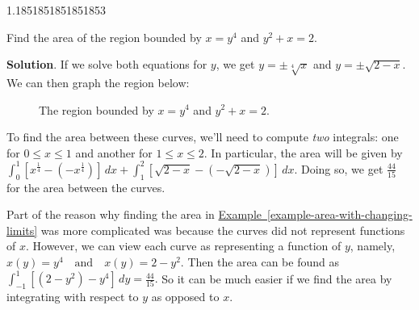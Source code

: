 \documentclass[10pt,]{book}
\theoremstyle{ptxplainnotitle}
\theoremstyle{ptxplaintitle}
\theoremstyle{ptxplainnotitle}
\theoremstyle{ptxplaintitle}
\theoremstyle{ptxplainnotitle}
\theoremstyle{ptxplaintitle}
\theoremstyle{ptxdefinitionnotitle}
\theoremstyle{ptxdefinitiontitle}
\theoremstyle{ptxdefinitionnotitle}
\theoremstyle{ptxdefinitiontitle}
\theoremstyle{ptxdefinitionnotitle}
\theoremstyle{ptxdefinitiontitle}
\theoremstyle{ptxdefinitionnotitle}
\theoremstyle{ptxdefinitiontitle}
\theoremstyle{ptxdefinitionnotitle}
\theoremstyle{ptxdefinitiontitle}
\numberwithin{equation}{section}
\begin{document}
\begin{sageoutput}
1.1851851851851853
\end{sageoutput}
\begin{example}\label{example-area-with-changing-limits}
\hypertarget{p-620}{}%
Find the area of the region bounded by \(x = y^{4}\) and \(y^{2} + x = 2\).%
\par\smallskip%
\noindent\textbf{Solution}.\hypertarget{solution-135}{}\quad%
\hypertarget{p-621}{}%
If we solve both equations for \(y\), we get \(y = \pm\sqrt[4]{x}\) and \(y = \pm\sqrt{2 - x}\). We can then graph the region below: \begin{figure}
\centering
{
}
\caption{The region bounded by \(x = y^{4}\) and \(y^{2} + x = 2\).\label{figure-graph-between-x-curves}}
\end{figure}
%
\par
\hypertarget{p-622}{}%
To find the area between these curves, we'll need to compute \emph{two} integrals: one for \(0\leq x\leq 1\) and another for \(1\leq x\leq 2\). In particular, the area will be given by \(\int_{0}^{1}[x^{\frac{1}{4}} - (-x^{\frac{1}{4}})]\,dx + \int_{1}^{2}[\sqrt{2 - x} - (-\sqrt{2 - x})]\,dx\). Doing so, we get \(\frac{44}{15}\) for the area between the curves.%
\end{example}
\hypertarget{p-623}{}%
Part of the reason why finding the area in \hyperref[example-area-with-changing-limits]{Example~\ref{example-area-with-changing-limits}} was more complicated was because the curves did not represent functions of \(x\). However, we can view each curve as representing a function of \(y\), namely, \(x(y) = y^{4} \quad\text{and}\quad x(y) = 2 - y^{2}.\) Then the area can be found as \(\int_{-1}^{1}[(2 - y^{2}) - y^{4}]\,dy = \frac{44}{15}.\) So it can be much easier if we find the area by integrating with respect to \(y\) as opposed to \(x\).%
\end{document}
